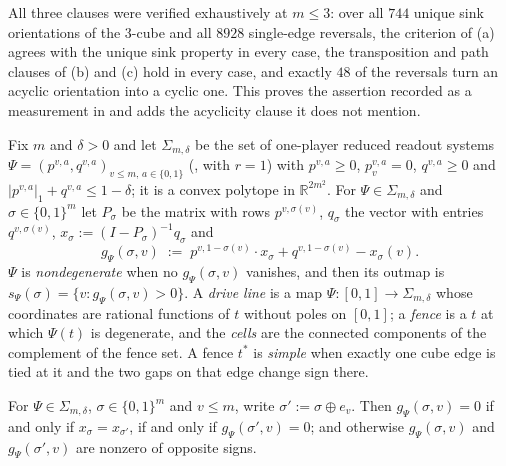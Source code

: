 \begin{remark}\label{mw:flip-verified}
All three clauses were verified exhaustively at $m\le3$: over all $744$
unique sink orientations of the $3$-cube and all $8928$ single-edge
reversals, the criterion of (a) agrees with the unique sink property in
every case, the transposition and path clauses of (b) and (c) hold in every
case, and exactly $48$ of the reversals turn an acyclic orientation into a
cyclic one. This proves the assertion recorded as a measurement in
 and adds the acyclicity clause it does not mention.
\end{remark}

\begin{definition}\label{mw:def-line}
Fix $m$ and $\delta>0$ and let $\Sigma_{m,\delta}$ be the set of one-player
reduced readout systems $\Psi=(p^{v,a},q^{v,a})_{v\le m,\,a\in\{0,1\}}$
(,  with $r=1$) with
$p^{v,a}\ge0$, $p^{v,a}_v=0$, $q^{v,a}\ge0$ and
$|p^{v,a}|_1+q^{v,a}\le1-\delta$; it is a convex polytope in
$\mathbb R^{2m^2}$. For $\Psi\in\Sigma_{m,\delta}$ and
$\sigma\in\{0,1\}^m$ let $P_\sigma$ be the matrix with rows $p^{v,\sigma(v)}$,
$q_\sigma$ the vector with entries $q^{v,\sigma(v)}$,
$x_\sigma:=(I-P_\sigma)^{-1}q_\sigma$ and
\[
  g_\Psi(\sigma,v)\;:=\;p^{v,1-\sigma(v)}\!\cdot x_\sigma+q^{v,1-\sigma(v)}-x_\sigma(v).
\]
$\Psi$ is \emph{nondegenerate} when no $g_\Psi(\sigma,v)$ vanishes, and then
its outmap is $s_\Psi(\sigma)=\{v:g_\Psi(\sigma,v)>0\}$. A \emph{drive line}
is a map $\Psi:[0,1]\to\Sigma_{m,\delta}$ whose coordinates are rational
functions of $t$ without poles on $[0,1]$; a \emph{fence} is a $t$ at which
$\Psi(t)$ is degenerate, and the \emph{cells} are the connected components of
the complement of the fence set. A fence $t^{\ast}$ is \emph{simple} when
exactly one cube edge is tied at it and the two gaps on that edge change sign
there.
\end{definition}

\begin{lemma}\label{mw:tie-edge}
For $\Psi\in\Sigma_{m,\delta}$, $\sigma\in\{0,1\}^m$ and $v\le m$, write
$\sigma':=\sigma\oplus e_v$. Then $g_\Psi(\sigma,v)=0$ if and only if
$x_\sigma=x_{\sigma'}$, if and only if $g_\Psi(\sigma',v)=0$; and otherwise
$g_\Psi(\sigma,v)$ and $g_\Psi(\sigma',v)$ are nonzero of opposite signs.
\end{lemma}

